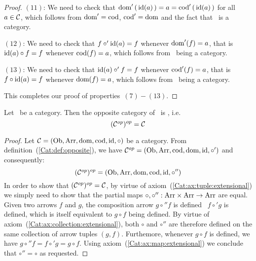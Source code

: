 \begin{proof}
    $(11)$: We need to check that $\mbox{\rm dom}'\,(\,\mbox{\rm id}(a)\,) = a = \mbox{\rm cod}'
    \,(\,\mbox{\rm id}(a)\,)$ for all $a\in\mbox{$\cal C$}$, which follows from $\mbox{\rm dom}'=\mbox{\rm cod}$,
    $\mbox{\rm cod}'=\mbox{\rm dom}$ and the fact that \Cat\ is a category.

    $(12)$: We need to check that $f\circ'\mbox{\rm id}(a)=f$ whenever $\mbox{\rm dom}'(f)=a$,
    that is $\mbox{\rm id}(a)\circ f=f$ whenever $\mbox{\rm cod}(f)=a$, which follows from
    \Cat\ being a category.

    $(13)$: We need to check that $\mbox{\rm id}(a)\circ' f=f$ whenever $\mbox{\rm cod}'(f)=a$,
    that is $f\circ\mbox{\rm id}(a)=f$ whenever $\mbox{\rm dom}(f)=a$, which follows from
    \Cat\ being a category.

    \noindent
    This completes our proof of properties~$(7)-(13)$.
\end{proof}

\begin{prop}\label{Cat:prop:opposite:opposite}
    Let \Cat\ be a category. Then the opposite category of \Cop\ is \Cat, i.e.
        \[
            (\mbox{${\cal C}^{op}$})^{op} = \mbox{$\cal C$}
        \]
\end{prop}
\begin{proof}
    Let $\mbox{$\cal C$}=(\mbox{\rm Ob}, \mbox{\rm Arr}, \mbox{\rm dom},\mbox{\rm cod}, \mbox{\rm id}, \circ)$ be a category. From
    definition~(\ref{Cat:def:opposite}), we have
    $\mbox{${\cal C}^{op}$}=(\mbox{\rm Ob}, \mbox{\rm Arr}, \mbox{\rm cod}, \mbox{\rm dom}, \mbox{\rm id}, \circ')$ and consequently:
        \[
            (\mbox{${\cal C}^{op}$})^{op}=(\mbox{\rm Ob}, \mbox{\rm Arr}, \mbox{\rm dom}, \mbox{\rm cod}, \mbox{\rm id}, \circ'')
        \]
    In order to show that $(\mbox{${\cal C}^{op}$})^{op}=\mbox{$\cal C$}$, by virtue of 
    axiom~(\ref{Cat:ax:tuple:extensional}) we simply need to show that
    the partial maps $\circ,\circ'':\mbox{\rm Arr}\times\mbox{\rm Arr}\to\mbox{\rm Arr}$ are equal.
    Given two arrows $f$ and $g$, the composition arrow $g\circ'' f$ is 
    defined \ifand\ $f\circ' g$ is defined, which is itself equivalent to 
    $g\circ f$ being defined. By virtue of
    axiom~(\ref{Cat:ax:collection:extensional}), both $\circ$ and $\circ''$ 
    are therefore defined on the same collection of arrow tuples $(g,f)$.
    Furthemore, whenever $g\circ f$ is defined, we have 
    $g\circ'' f=f\circ' g=g\circ f$. Using axiom~(\ref{Cat:ax:map:extensional})
    we conclude that $\circ''=\circ$ as requested.
\end{proof}

